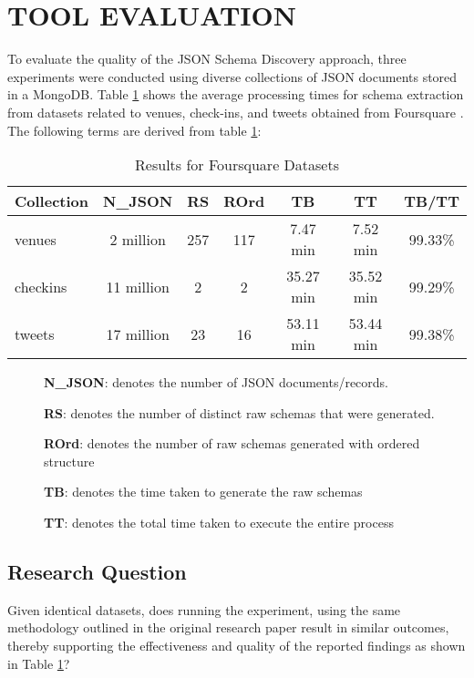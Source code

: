 \documentclass[sigconf, nonacm]{acmart}
\begin{document}
\section{TOOL EVALUATION}
To evaluate the quality of the JSON Schema Discovery approach, three experiments were conducted using diverse collections of JSON documents stored in a MongoDB. 
Table \ref{foursquare} shows the average processing times for schema extraction from datasets related to venues, check-ins, and tweets obtained from Foursquare \cite{ccelikten2016modeling} \cite{frozza2018approach}. The following terms are derived from table \ref{foursquare}:

\begin{table}
\centering
\caption{Results for Foursquare Datasets \cite{frozza2018approach}}\label{foursquare}
\scalebox{0.79} {
\begin{tabular}{|l|c|c|c|c|c|c|}
\hline
\textbf{Collection} & \textbf{N\_JSON} & \textbf{RS} & \textbf{ROrd} & \textbf{TB} & \textbf{TT} & \textbf{TB/TT} \\
\hline
venues & 2 million & 257 & 117 & 7.47 min & 7.52 min & 99.33\% \\
\hline 
checkins & 11 million & 2 & 2 & 35.27 min & 35.52 min & 99.29\% \\
\hline
tweets & 17 million & 23 & 16 & 53.11 min & 53.44 min & 99.38\% \\
\hline
\end{tabular}
}
\end{table}

\begin{description}
  \item[\textbullet] \textbf{N\_JSON}: denotes the number of JSON documents/records.
  \item[\textbullet] \textbf{RS}: denotes the number of distinct raw schemas that were generated.
  \item[\textbullet]\textbf{ROrd}: denotes the number of raw schemas generated with ordered structure
  \item[\textbullet]\textbf{TB}: denotes the time taken to generate the raw schemas
  \item[\textbullet]\textbf{TT}: denotes the total time taken to execute the entire process
\end{description}

\subsection{Research Question}
Given identical datasets, does running the experiment, using the same methodology outlined in the original research paper result in similar outcomes, thereby supporting the effectiveness and quality of the reported findings as shown in Table \ref{foursquare}?
\end{document}
